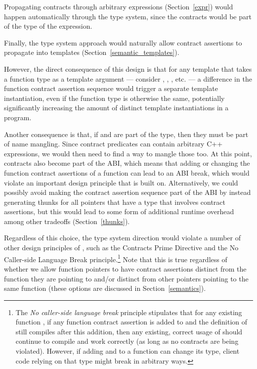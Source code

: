 Propagating contracts through arbitrary expressions (Section~\ref{expr}) would happen automatically through the type system, since the contracts would be part of the type of the expression.

Finally, the type system approach would naturally allow contract assertions to propagate into templates (Section~\ref{semantic_templates}). 

However, the direct consequence of this design is that for any template that takes a function type as a template argument --- consider , , , etc. --- a difference in the function contract assertion sequence would trigger a separate template instantiation, even if the function type is otherwise the same, potentially significantly increasing the amount of distinct template instantiations in a program. 

Another consequence is that, if  and  are part of the type,  then they must be part of name mangling. Since contract predicates can contain arbitrary C++ expressions, we would then need to find a way to mangle those too. At this point, contracts also become part of the ABI, which means that adding or changing the function contract assertions of a function can lead to an ABI break, which would violate an important design principle that \cite{P2900R9} is built on. Alternatively, we could possibly avoid making the contract assertion sequence part of the ABI by instead generating thunks for all pointers that have a type that involves contract assertions, but this would lead to some form of additional runtime overhead among other tradeoffs (Section~\ref{thunks}).

Regardless of this choice, the type system direction would violate a number of other design principles of \cite{P2900R9}, such as the Contracts Prime Directive and the No Caller-side Language Break principle.\footnote{ The \emph{No caller-side language break} principle stipulates that for any existing function , if any function contract assertion is added to  and the definition of  still compiles after this addition, then any existing, correct usage of  should continue to compile and work correctly (as long as no contracts are being violated). However, if adding  and  to a function can change its type, client code relying on that type might break in arbitrary ways.} Note that this is true regardless of whether we allow function pointers to have contract assertions distinct from the function they are pointing to and/or distinct from other pointers pointing to the same function (these options are discussed in Section~\ref{semantics}).

